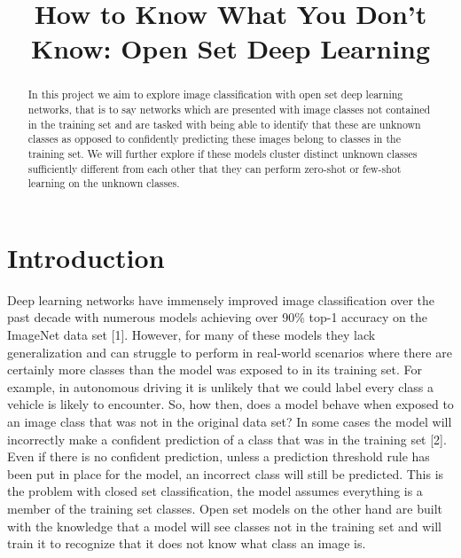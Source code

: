 \documentclass[conference]{IEEEtran}
\begin{document}
\title{How to Know What You Don't Know: Open Set Deep Learning\\}

\author{
\and
{}
\and
{}
}

\maketitle

\begin{abstract}
In this project we aim to explore image classification with open set deep learning networks, that is to say networks which are presented with image classes not contained in the training set and are tasked with being able to identify that these are unknown classes as opposed to confidently predicting these images belong to classes in the training set. We will further explore if these models cluster distinct unknown classes sufficiently different from each other that they can perform zero-shot or few-shot learning on the unknown classes. 
\end{abstract}

\section{Introduction}
Deep learning networks have immensely improved image classification over the past decade with numerous models achieving over 90\% top-1 accuracy on the ImageNet data set [1]. However, for many of these models they lack generalization and can struggle to perform in real-world scenarios where there are certainly more classes than the model was exposed to in its training set. For example, in autonomous driving it is unlikely that we could label every class a vehicle is likely to encounter. So, how then, does a  model behave when exposed to an image class that was not in the original data set? In some cases the model will incorrectly make a confident prediction of a class that was in the training set [2]. Even if there is no confident prediction, unless a prediction threshold rule has been put in place for the model, an incorrect class will still be predicted. This is the problem with closed set classification, the model assumes everything is a member of the training set classes. Open set models on the other hand are built with the knowledge that a model will see classes not in the training set and will train it to recognize that it does not know what class an image is.\\
\end{document}
